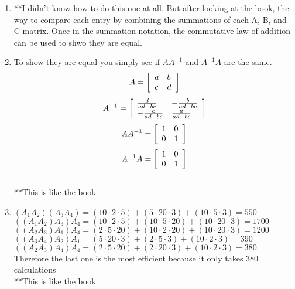 \documentclass{article}
\begin{document}
\begin{enumerate}
\item  **I didn't know how to do this one at all. But after looking at the book, the way to compare each entry by combining the summations of each A, B, and C matrix. Once in the summation notation, the commutative law of addition can be used to shwo they are equal.

\item To show they are equal you simply see if $AA^{-1}$ and $A^{-1}A$ are the same. \\
	\[
	A =
	\left[
	 \begin{array}{l l}
		a & b  \\
		c & d  \\
	 \end{array}
	\right]
	\]	
	\[
	A^{-1} =
	\left[
	 \begin{array}{l l}
		\frac{d}{ad-bc} & -\frac{b}{ad-bc}  \\
		-\frac{c}{ad-bc} &  \frac{a}{ad-bc} \\
	 \end{array}
	\right]
	\]
	\[
	AA^{-1}=
	\left[
	 \begin{array}{c c}
		1 & 0  \\
		0 & 1  \\
	 \end{array}
	\right]
	\]
	\[
	A^{-1}A=
	\left[
	 \begin{array}{c c}
		1 & 0  \\
		0 & 1  \\
	 \end{array}
	\right]
	\] \\
	**This is like the book

\item	$(A_1A_2)(A_3A_4) = (10 \cdot 2 \cdot 5) + (5 \cdot 20 \cdot 3) + (10 \cdot 5 \cdot 3) = 550$ \\
	$((A_1A_2)A_3)A_4 = (10 \cdot 2 \cdot 5) + (10 \cdot 5 \cdot 20) + (10 \cdot 20 \cdot 3) = 1700$ \\
	$((A_2A_3)A_1)A_4 = (2 \cdot 5 \cdot 20) + (10 \cdot 2 \cdot 20) + (10 \cdot 20 \cdot 3) = 1200$ \\
	$((A_3A_4)A_2)A_1 = (5 \cdot 20 \cdot 3) + (2 \cdot 5 \cdot 3) + (10 \cdot 2 \cdot 3) = 390$ \\
	$((A_2A_3)A_4)A_4 = (2 \cdot 5 \cdot 20) + (2 \cdot 20 \cdot 3) + (10 \cdot 2 \cdot 3) = 380$ \\
	Therefore the last one is the most efficient because it only takes 380 calculations \\
	**This is like the book



\end{enumerate}
\end{document}
